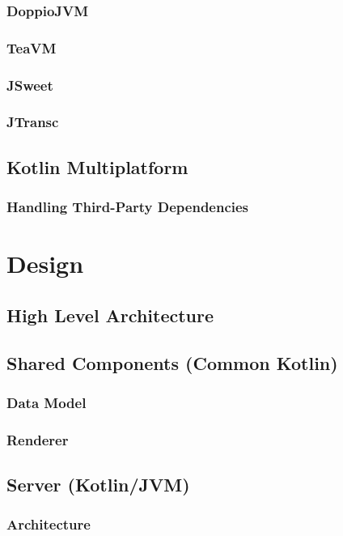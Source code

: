 \documentclass[12pt,a4paper,openright,twoside]{book}
\begin{document}
\subsection{DoppioJVM}
\label{ssec:doppiojvm}
\subsection{TeaVM}
\label{ssec:teavm}
\subsection{JSweet}
\label{ssec:jsweet}
\subsection{JTransc}
\label{ssec:jtransc}
\section{Kotlin Multiplatform}
\label{sec:kotlin-multiplatform}
\subsection{Handling Third-Party Dependencies}
\label{ssec:handling-third-party-dependencies}
\chapter{Design}
\label{chap:design}
\section{High Level Architecture}
\label{sec:high-level-architecture}
\section{Shared Components (Common Kotlin)}
\label{sec:shared-components-common-kotlin}
\subsection{Data Model}
\label{ssec:data-model}
\subsection{Renderer}
\label{ssec:renderer}
\section{Server (Kotlin/JVM)}
\label{sec:server-kotlin-jvm}
\subsection{Architecture}
\label{ssec:architecture}
\end{document}

